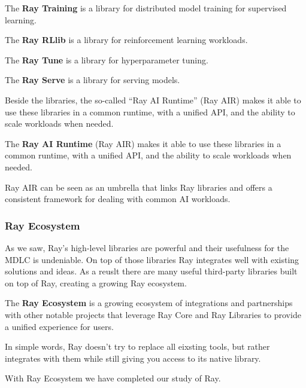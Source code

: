 The \textbf{Ray Training} is a library for distributed model training for supervised learning.
\ed

The \textbf{Ray RLlib} is a library for reinforcement learning workloads.
\ed

The \textbf{Ray Tune} is a library for hyperparameter tuning.
\ed

The \textbf{Ray Serve} is a library for serving models.
\ed

Beside the libraries, the so-called ``Ray AI Runtime'' (Ray AIR) makes it able to use these libraries in a common
runtime, with a unified API, and the ability to scale workloads when needed.

The \textbf{Ray AI Runtime} (Ray AIR) makes it able to use these libraries in a common runtime, with a unified API,
and the ability to scale workloads when needed.
\ed

Ray AIR can be seen as an umbrella that links Ray libraries and offers a consistent framework for dealing with common
AI workloads.

\subsubsection{Ray Ecosystem}

As we saw, Ray's high-level libraries are powerful and their usefulness for the MDLC is undeniable. On top of those
libraries Ray integrates well with existing solutions and ideas. As a reuslt there are many useful third-party
libraries built on top of Ray, creating a growing Ray ecosystem.

The \textbf{Ray Ecosystem} is a growing ecosystem of integrations and partnerships with other notable projects that
leverage Ray Core and Ray Libraries to provide a unified experience for users.
\ed

In simple words, Ray doesn't try to replace all eixsting tools, but rather integrates with them while still giving
you access to its native library.

With Ray Ecosystem we have completed our study of Ray.

